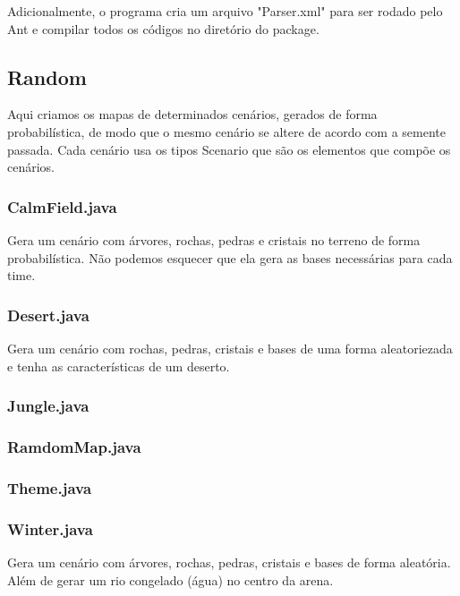 \documentclass[a4paper]{article}
\begin{document}
{{{{{{{{{{{{{{{{{{		    Adicionalmente, o programa cria um arquivo "Parser.xml"
		    para ser rodado pelo Ant e compilar todos os códigos no
		    diretório do package.
				
\newpage %

	\subsection{Random}
	    Aqui criamos os mapas de determinados cenários,
	    gerados de forma probabilística, de modo que
	    o mesmo cenário se altere de acordo com a semente
	    passada. Cada cenário usa os tipos Scenario que são
	    os elementos que compõe os cenários.
	    
		\subsubsection{ CalmField.java }
		    Gera um cenário com árvores, rochas, pedras e 
		    cristais no terreno de forma probabilística.
		    Não podemos esquecer que ela gera as bases
		    necessárias para cada time.
		    
		\subsubsection{ Desert.java }
		    Gera um cenário com rochas, pedras, cristais e
		    bases de uma forma aleatoriezada e tenha as
		    características de um deserto.
		    
		\subsubsection{ Jungle.java }
		
		\subsubsection{ RamdomMap.java }
		
		\subsubsection{ Theme.java }
		
		\subsubsection{ Winter.java }
		    Gera um cenário com árvores, rochas, pedras, 
		    cristais e bases de forma aleatória. Além de
		    gerar um rio congelado (água) no centro da arena.
		    

}}}}}}}}}}}}}}}}}}
\end{document}
